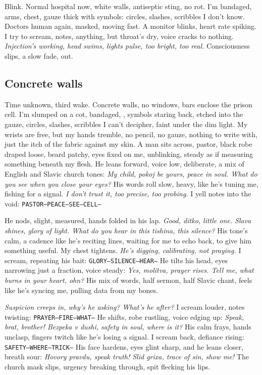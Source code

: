 \documentclass[12pt,oneside]{book}
\newcommand{\note}[1]{\texttt{#1}}
\begin{document}
Blink. Normal hospital now, white walls, antiseptic sting, no rot. I’m bandaged, arms, chest, gauze thick with symbols: circles, slashes, scribbles I don’t know. Doctors human again, masked, moving fast. A monitor blinks, heart rate spiking. I try to scream, notes, anything, but throat’s dry, voice cracks to nothing. \textit{Injection’s working, head swims, lights pulse, too bright, too real.} Consciousness slips, a slow fade, out.

\subsection*{Concrete walls}
Time unknown, third wake. Concrete walls, no windows, bars enclose the prison cell. I’m slumped on a cot, bandaged, , symbols staring back, etched into the gauze, circles, slashes, scribbles I can’t decipher, faint under the dim light. My wrists are free, but my hands tremble, no pencil, no gauze, nothing to write with, just the itch of the fabric against my skin. A man sits across, pastor, black robe draped loose, beard patchy, eyes fixed on me, unblinking, steady as if measuring something beneath my flesh. He leans forward, voice low, deliberate, a mix of English and Slavic church tones: \textit{My child, pokoj be yours, peace in soul. What do you see when you close your eyes?} His words roll slow, heavy, like he’s tuning me, fishing for a signal. \textit{I don’t trust it, too precise, too probing.} I yell notes into the void: \note{PASTOR—PEACE—SEE—CELL—}

He nods, slight, measured, hands folded in his lap. \textit{Good, ditko, little one. Slava shines, glory of light. What do you hear in this tishina, this silence?} His tone’s calm, a cadence like he’s reciting lines, waiting for me to echo back, to give him something useful. My chest tightens. \textit{He’s digging, calibrating, not praying.} I scream, repeating his bait: \note{GLORY—SILENCE—HEAR—} He tilts his head, eyes narrowing just a fraction, voice steady: \textit{Yes, molitva, prayer rises. Tell me, what burns in your heart, ohn?} His mix of words, half sermon, half Slavic chant, feels like he’s syncing me, pulling data from my bones.

\textit{Suspicion creeps in, why’s he asking? What’s he after?} I scream louder, notes twisting: \note{PRAYER—FIRE—WHAT—} He shifts, robe rustling, voice edging up: \textit{Speak, brat, brother! Bezpeka v dushi, safety in soul, where is it?} His calm frays, hands unclasp, fingers twitch like he’s losing a signal. I scream back, defiance rising: \note{SAFETY—WHERE—TRICK—} His face hardens, eyes glint sharp, and he leans closer, breath sour: \textit{Hovory pravdu, speak truth! Slid grixa, trace of sin, show me!} The church mask slips, urgency breaking through, spit flecking his lips.
\end{document}
